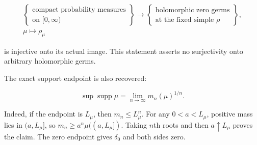 \[
\begin{gathered}
\left\{\begin{gathered}\text{compact probability measures}\\
\text{on }[0,\infty)\end{gathered}\right\}
\longrightarrow
\left\{\begin{gathered}\text{holomorphic zero germs}\\
\text{at the fixed simple }\rho\end{gathered}\right\},\\[3pt]
\mu\longmapsto\rho_\mu
\end{gathered}
\]

is injective onto its actual image. This statement asserts no surjectivity onto arbitrary holomorphic germs.

The exact support endpoint is also recovered:

\[
\sup\operatorname{supp}\mu=\lim_{n\to\infty}m_n(\mu)^{1/n}.
\tag{H9}
\]

Indeed, if the endpoint is \(L_\mu\), then \(m_n\le L_\mu ^n\). For any \(0<a<L_\mu\), positive mass lies in \((a,L_\mu ]\), so \(m_n\ge a^n \mu ((a,L_\mu ])\). Taking \(n\)th roots and then \(a\uparrow L_\mu\) proves the claim. The zero endpoint gives \(\delta _0\) and both sides zero.

